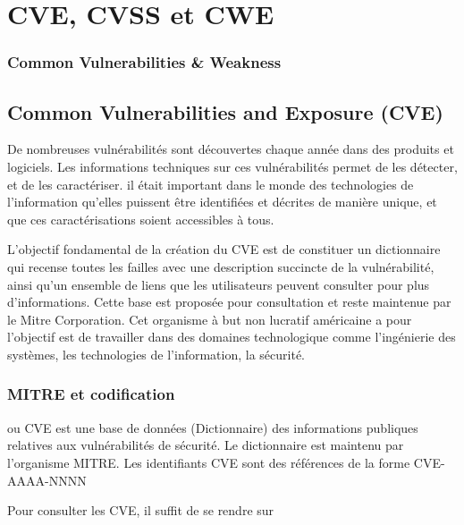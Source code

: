 
\section{CVE, CVSS et CWE}


\begin{frame}
\frametitle<presentation>{Common Vulnerabilities \& Weakness}
\end{frame}


\subsection{Common Vulnerabilities and Exposure (CVE)}

De nombreuses vulnérabilités sont découvertes chaque année dans des produits et logiciels. Les informations techniques sur ces vulnérabilités permet de les détecter, et de les caractériser. il était important dans le monde des technologies de l'information qu'elles puissent être identifiées et décrites de manière unique, et que ces caractérisations soient accessibles à tous.

L’objectif fondamental de la création du CVE est de constituer un dictionnaire qui recense toutes les failles avec une description succincte de la vulnérabilité, ainsi qu’un ensemble de liens que les utilisateurs peuvent consulter pour plus d’informations. Cette base  est proposée pour consultation et reste maintenue par le Mitre Corporation.  Cet organisme à but non lucratif américaine a pour  l'objectif est de travailler dans des domaines technologique comme l'ingénierie des systèmes, les technologies de l'information, la sécurité. 



\begin{frame}
\frametitle<presentation>{MITRE et codification}
 ou CVE est une base de données (Dictionnaire) des informations publiques relatives aux vulnérabilités de sécurité. Le dictionnaire est maintenu par l'organisme MITRE.  Les identifiants CVE sont des références de la forme CVE-AAAA-NNNN 
 
 Pour consulter les CVE,  il suffit de se rendre sur 

\end{frame}

